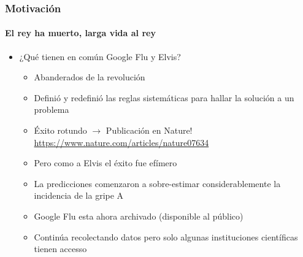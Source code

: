 \documentclass[
  shownotes,
  xcolor={svgnames},
  hyperref={colorlinks,citecolor=DarkBlue,linkcolor=DarkRed,urlcolor=DarkBlue}
  , aspectratio=169]{beamer}
\begin{document}

\begin{frame}
\frametitle{Motivación}
\framesubtitle{El rey ha muerto, larga vida al rey}
  \begin{itemize}
    \item ¿Qué tienen en común Google Flu y Elvis?
    \bigskip
    \begin{itemize}
      \item Abanderados de la revolución
      \medskip
      \item Definió y redefinió las reglas sistemáticas para hallar la solución a un problema
      \medskip
      \item Éxito rotundo $\rightarrow$ Publicación en Nature! \url{https://www.nature.com/articles/nature07634}
      \medskip
      \item Pero como a Elvis el éxito fue efímero
      \medskip
      \item La predicciones comenzaron a sobre-estimar considerablemente la incidencia de la gripe A
      \medskip
      \item Google Flu esta ahora archivado (disponible al público)
      \medskip
      \item Continúa recolectando datos pero solo algunas instituciones científicas tienen accesso 
    \end{itemize}  
  \end{itemize}  
\end{frame}
\end{document}
